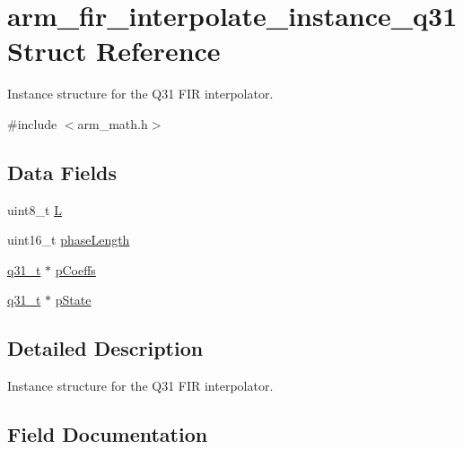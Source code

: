 \hypertarget{structarm__fir__interpolate__instance__q31}{}\section{arm\+\_\+fir\+\_\+interpolate\+\_\+instance\+\_\+q31 Struct Reference}
\label{structarm__fir__interpolate__instance__q31}


Instance structure for the Q31 F\+IR interpolator.  




{\ttfamily \#include $<$arm\+\_\+math.\+h$>$}

\subsection*{Data Fields}
\begin{DoxyCompactItemize}
\item 
uint8\+\_\+t \mbox{\hyperlink{structarm__fir__interpolate__instance__q31_aee73cc056696e504430c53eaa9c58cf0}{L}}
\item 
uint16\+\_\+t \mbox{\hyperlink{structarm__fir__interpolate__instance__q31_a8f92bb07e0812f94679438cdf412b26a}{phase\+Length}}
\item 
\mbox{\hyperlink{arm__math_8h_adc89a3547f5324b7b3b95adec3806bc0}{q31\+\_\+t}} $\ast$ \mbox{\hyperlink{structarm__fir__interpolate__instance__q31_a68888e36167d81cb7836db10367a1682}{p\+Coeffs}}
\item 
\mbox{\hyperlink{arm__math_8h_adc89a3547f5324b7b3b95adec3806bc0}{q31\+\_\+t}} $\ast$ \mbox{\hyperlink{structarm__fir__interpolate__instance__q31_adee4ba3ee8869865af7d8fa08ca913d6}{p\+State}}
\end{DoxyCompactItemize}


\subsection{Detailed Description}
Instance structure for the Q31 F\+IR interpolator. 

\subsection{Field Documentation}
\mbox{\label{structarm__fir__interpolate__instance__q31_aee73cc056696e504430c53eaa9c58cf0}} 
